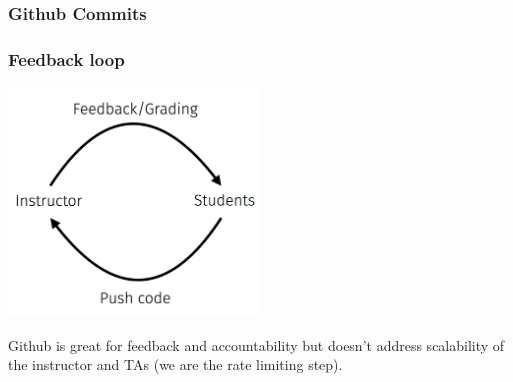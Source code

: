 \documentclass[12pt]{beamer}
\begin{document}

\begin{frame}
\frametitle{Github Commits}


\end{frame}


\begin{frame}
\frametitle{Feedback loop}

\begin{center}
\includegraphics[width=0.5\textwidth]{imgs/cycle.png}
\end{center}

\pause

Github is great for feedback and accountability but doesn't address scalability of the instructor and TAs (we are the rate limiting step).

\end{frame}
\end{document}
